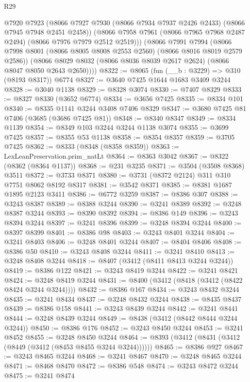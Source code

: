 \begin{lexlean}{R29}
\begin{coremodule}
        @7920
        @7923
        (@8066 @7927 @7930 (@8066 @7934 @7937 @2426 @2433) (@8066 @7945 @7948 @2451 @2458))
        (@8066 @7958 @7961 (@8066 @7965 @7968 @2487 @2494) (@8066 @7976 @7979 @2512 @2519)))
      (@8066
        @7991
        @7994
        (@8066 @7998 @8001 (@8066 @8005 @8008 @2553 @2560) (@8066 @8016 @8019 @2579 @2586))
        (@8066 @8029 @8032 (@8066 @8036 @8039 @2617 @2624) (@8066 @8047 @8050 @2643 @2650))))
@8322 := @8065 (fun (__b : @3229) => @310 (@8193 @8317)) @6774
@8327 := @3640 @7425 @1644 @1683 @3409 @3244
@8328 := @3040 @1138
@8329 := @8328 @3074
@8330 := @7407 @8329
@8333 := @8327 @8330 (@3652 @6774)
@8334 := @3656 @7425
@8335 := @8334 @101
@8340 := @8335 @1141 @3244 @3408 @7406 @8329
@8347 := @3680 @7425 @81 @7406 (@3685 (@3686 @7425 @81))
@8348 := @8340 @8347
@8349 := @8334 @1139
@8354 := @8349 @103 @3244 @3244 @1138 @3074
@8355 := @3699 @7425
@8357 := @8355 @53 @1138
@8358 := @8354 @8357
@8359 := @3705 @7425
@8362 := @8333 (@8348 (@8358 @8359))
@8363 := LexLeanPreservation.prim_natLt
@8364 := @8363 @3042
@8367 := @8322 (@8362 (@8364 @1137))
@8368 := @231 @3235
@8371 := @3504 (@3508 @8368) @3511
@8372 := @3733 @8371
@8380 := @3731 (@8372 @2124) @311 @310 @7751 @8062 @8192 @8317
@8381 := @3542 @8371
@8385 := @8381 @1687 @1895 @2123 @3411
@8386 := @6772 @3259
@8387 := @8386 @307
@8388 := @3243 @8387
@8389 := @8388 @3244
@8390 := @3241 @8389
@8392 := @3248 @8387 @3244
@8393 := @8390 @8392
@8394 := @8386 @149
@8396 := @3243 @8394 @3244
@8397 := @3241 @8396
@8399 := @3248 @8394 @3244
@8400 := @8397 @8399
@8401 := @8386 @98
@8403 := @3243 @8401 @3244
@8404 := @3241 @8403
@8406 := @3248 @8401 @3244
@8407 := @8404 @8406
@8408 := @8386 @50
@8410 := @3243 @8408 @3244
@8411 := @3241 @8410
@8413 := @3248 @8408 @3244
@8418 := @8407 (@3412 (@8411 @8413 @3244 @3244))
@8419 := @8386 @122
@8421 := @3243 @8419 @3244
@8422 := @3241 @8421
@8424 := @3248 @8419 @3244
@8431 := @8400 (@3412 (@8418 (@3412 (@8422 @8424 @3244 @3244))))
@8432 := @8386 @167
@8434 := @3243 @8432 @3244
@8435 := @3241 @8434
@8437 := @3248 @8432 @3244
@8438 := @8435 @8437
@8439 := @8386 @158
@8441 := @3243 @8439 @3244
@8442 := @3241 @8441
@8444 := @3248 @8439 @3244
@8449 := @8438 (@3412 (@8442 @8444 @3244 @3244))
@8450 := @8386 @176
@8452 := @3243 @8450 @3244
@8453 := @3241 @8452
@8455 := @3248 @8450 @3244
@8464 := @8393 (@3412 (@8431 (@3412 (@8449 (@3412 (@8453 @8455 @3244 @3244))))))
@8465 := @8386 @927
@8467 := @3243 @8465 @3244
@8468 := @3241 @8467
@8470 := @3248 @8465 @3244
@8471 := @8468 @8470
@8472 := @8386 @548
@8474 := @3243 @8472 @3244
@8475 := @3241 @8474

\end{coremodule}
\end{lexlean}

